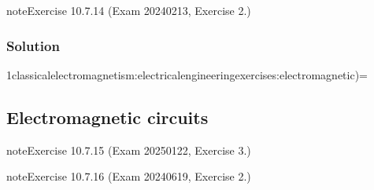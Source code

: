 \documentclass[letterpaper,10pt,italian]{jupyterBook}
\begin{document}
\begin{sphinxadmonition}{note}{Exercise 10.7.14 (Exam 2024\sphinxhyphen{}02\sphinxhyphen{}13, Exercise 2.)}



\begin{figure}[htbp]
\centering

\noindent{}
\end{figure}
\subsubsection*{Solution}
\end{sphinxadmonition}

\sphinxstepscope

\sphinxAtStartPar
1classical\sphinxhyphen{}electromagnetism:electrical\sphinxhyphen{}engineering\sphinxhyphen{}exercises:electromagnetic)=


\subsection{Electromagnetic circuits}
\label{\detokenize{ch/electrical-engineering-exercises-electromagnetic:electromagnetic-circuits}}\label{\detokenize{ch/electrical-engineering-exercises-electromagnetic::doc}} \label{exercise:exam-25-01-22-exe-03}

\begin{sphinxadmonition}{note}{Exercise 10.7.15 (Exam 2025\sphinxhyphen{}01\sphinxhyphen{}22, Exercise 3.)}



\begin{figure}[htbp]
\centering

\noindent{}
\end{figure}
\end{sphinxadmonition}
 \label{exercise:exam-24-06-19-exe-02}

\begin{sphinxadmonition}{note}{Exercise 10.7.16 (Exam 2024\sphinxhyphen{}06\sphinxhyphen{}19, Exercise 2.)}



\begin{figure}[htbp]
\centering

\noindent{}
\end{figure}
\end{sphinxadmonition}
 \label{exercise:exam-24-02-13-exe-01-a}
\end{document}
